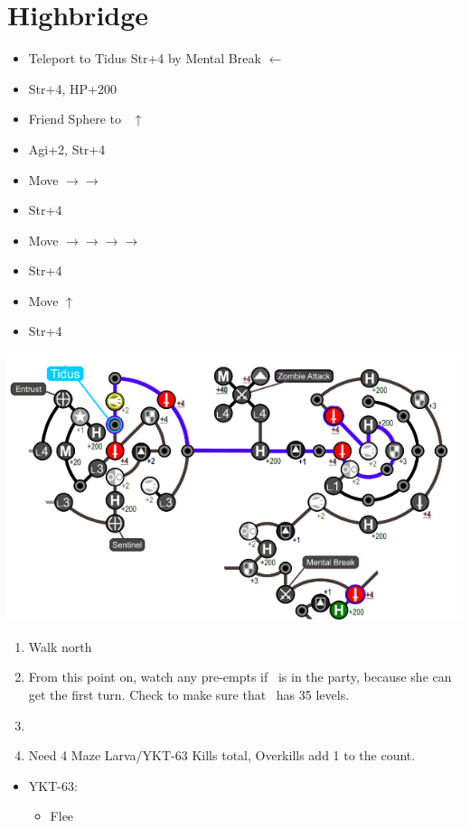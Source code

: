 \chapter{Highbridge}
\begin{spheregrid}
	\begin{itemize}
		\yunaf
		\begin{itemize}
			\item Teleport to Tidus Str+4 by Mental Break $\leftarrow$
			\item Str+4, HP+200
			\item Friend Sphere to \tidus\ $\uparrow$
			\item Agi+2, Str+4
			\item Move $\rightarrow\rightarrow$
			\item Str+4
			\item Move $\rightarrow\rightarrow\rightarrow\rightarrow$
			\item Str+4
			\item Move $\uparrow$
			\item Str+4
		\end{itemize}
		\includegraphics[width=.9\columnwidth]{graphics/Yuna_blitz_loss_highbridge_1}
	\end{itemize}
\end{spheregrid}
\begin{enumerate}
	\item Walk north
	\item From this point on, watch any pre-empts if \yuna\ is in the party, because she can get the first turn. Check to make sure that \lulu\ has 35 levels.
	\item \formation{\tidus}{\yuna}{\auron}
	\item Need 4 Maze Larva/YKT-63 Kills total, Overkills add 1 to the count.
\end{enumerate}
\begin{encounters}
	\begin{itemize}
		\item YKT-63:
		      \begin{itemize}
			      \tidusf Attack
			      \yunaf Attack
			      \item Flee
		      \end{itemize}
	\end{itemize}
\end{encounters}
